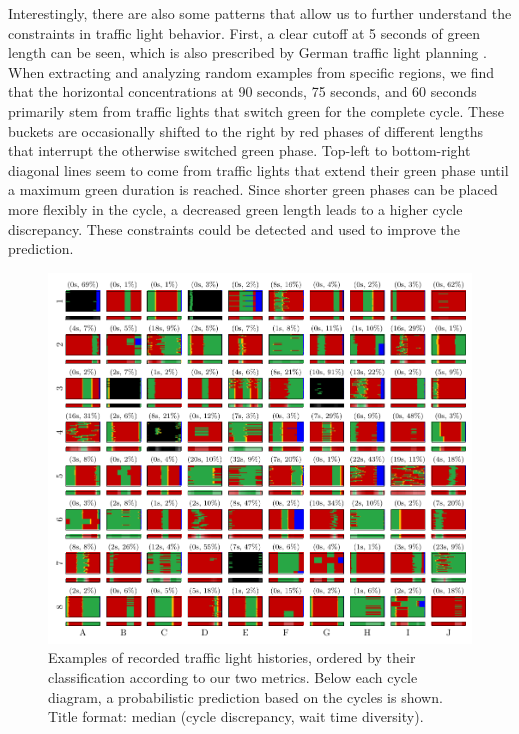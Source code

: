 Interestingly, there are also some patterns that allow us to further understand the constraints in traffic light behavior. First, a clear cutoff at 5 seconds of green length can be seen, which is also prescribed by German traffic light planning \cite{TN_libero_mab2}. When extracting and analyzing random examples from specific regions, we find that the horizontal concentrations at 90 seconds, 75 seconds, and 60 seconds primarily stem from traffic lights that switch green for the complete cycle. These buckets are occasionally shifted to the right by red phases of different lengths that interrupt the otherwise switched green phase. Top-left to bottom-right diagonal lines seem to come from traffic lights that extend their green phase until a maximum green duration is reached. Since shorter green phases can be placed more flexibly in the cycle, a decreased green length leads to a higher cycle discrepancy. These constraints could be detected and used to improve the prediction.

\begin{figure}[t]
    \centering
    \includegraphics[width=\linewidth]{images/predictability-case-studies.pdf}
    \caption{Examples of recorded traffic light histories, ordered by their classification according to our two metrics. Below each cycle diagram, a probabilistic prediction based on the cycles is shown. Title format: median (cycle discrepancy, wait time diversity).}\label{fig:types-of-instability}
\end{figure}

